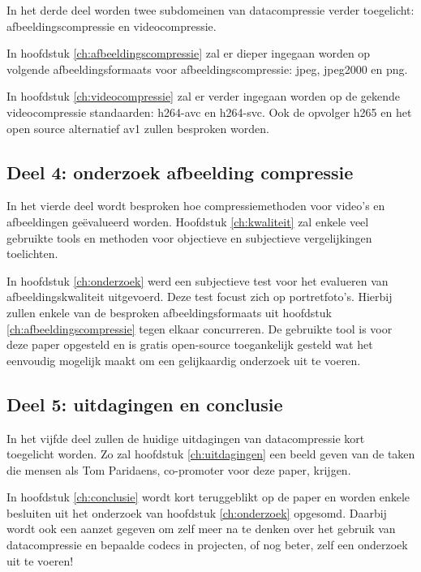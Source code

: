 In het derde deel worden twee subdomeinen van \gls{datacompressie} verder toegelicht: \gls{afbeeldingscompressie} en \gls{videocompressie}. 

In hoofdstuk \ref{ch:afbeeldingscompressie} zal er dieper ingegaan worden op volgende \glspl{afbeeldingsformaat} voor \gls{afbeeldingscompressie}: \gls{jpeg}, \gls{jpeg2000} en \gls{png}. 

In hoofdstuk \ref{ch:videocompressie} zal er verder ingegaan worden op de gekende \gls{videocompressie} standaarden: \gls{h264-avc} en \gls{h264-svc}. Ook de opvolger \gls{h265} en het open source alternatief \gls{av1} zullen besproken worden.

\subsection{Deel 4: onderzoek afbeelding compressie}
\label{sec:opzet-bachelorproef-deel-4}

In het vierde deel wordt besproken hoe compressiemethoden voor video's en afbeeldingen geëvalueerd worden. Hoofdstuk \ref{ch:kwaliteit} zal enkele veel gebruikte tools en methoden voor objectieve en subjectieve vergelijkingen toelichten.

In hoofdstuk \ref{ch:onderzoek} werd een subjectieve test voor het evalueren van afbeeldingskwaliteit uitgevoerd. Deze test focust zich op portretfoto's. Hierbij zullen enkele van de besproken \glspl{afbeeldingsformaat} uit hoofdstuk \ref{ch:afbeeldingscompressie} tegen elkaar concurreren. De gebruikte tool is voor deze paper opgesteld en is gratis \gls{open-source} toegankelijk gesteld wat het eenvoudig mogelijk maakt om een gelijkaardig onderzoek uit te voeren.

\subsection{Deel 5: uitdagingen en conclusie}
\label{sec:opzet-bachelorproef-deel-5}

In het vijfde deel zullen de huidige uitdagingen van \gls{datacompressie} kort toegelicht worden. Zo zal hoofdstuk \ref{ch:uitdagingen} een beeld geven van de taken die mensen als Tom Paridaens, co-promoter voor deze paper, krijgen.

In hoofdstuk \ref{ch:conclusie} wordt kort teruggeblikt op de paper en worden enkele besluiten uit het onderzoek van hoofdstuk \ref{ch:onderzoek} opgesomd. Daarbij wordt ook een aanzet gegeven om zelf meer na te denken over het gebruik van \gls{datacompressie} en bepaalde  \glspl{codec} in projecten, of nog beter, zelf een onderzoek uit te voeren!

